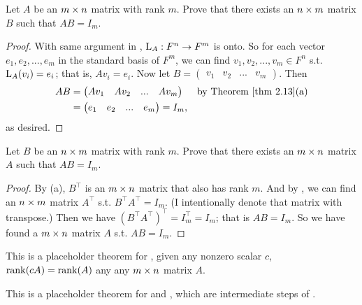 \begin{exercise} \label{exercise 3.2.21}
Let \(A\) be an \(m \times n\) matrix with rank \(m\).
Prove that there exists an \(n \times m\) matrix \(B\) such that \(AB = I_m\).
\end{exercise}

\begin{proof}
With same argument in , \(\mathrm{L}_A : F^n \to F^m\) is onto.
So for each vector \(e_1, e_2, ..., e_m\) in the standard basis of \(F^m\), we can find \(v_1, v_2, ..., v_m \in F^n\) s.t. \(\mathrm{L}_A(v_i) = e_i\);
that is, \(A v_i = e_i\).
Now let \(B = \begin{pmatrix} v_1 & v_2 & ... & v_m \end{pmatrix}\).
Then
\begin{align*}
    AB & = \begin{pmatrix} A v_1 & A v_2 & ... & A v_m \end{pmatrix} & \text{by \THM{2.13}(a)} \\
       & = \begin{pmatrix} e_1 & e_2 & ... & e_m \end{pmatrix} = I_m,
\end{align*}
as desired.
\end{proof}

\begin{exercise} \label{exercise 3.2.22}
Let \(B\) be an \(n \times m\) matrix with rank \(m\).
Prove that there exists an \(m \times n\) matrix \(A\) such that \(AB = I_m\).
\end{exercise}

\begin{proof}
By (a), \(B^\top\) is an \(m \times n\) matrix that also has rank \(m\).
And by , we can find an \(n \times m\) matrix \(A^\top\) s.t. \(B^\top A^\top = I_m\).
(I intentionally denote that matrix with transpose.)
Then we have \((B^\top A^\top)^\top = I_m^\top = I_m\);
that is \(A B = I_m\).
So we have found a \(m \times n\) matrix \(A\) s.t. \(A B = I_m\).
\end{proof}

\begin{additional theorem} \label{athm 3.4}
This is a placeholder theorem for , given any nonzero scalar \(c\), \(\mathrm{rank}(cA) = \mathrm{rank}(A)\) any any \(m \times n\) matrix \(A\).
\end{additional theorem}

\begin{additional theorem} \label{athm 3.5}
This is a placeholder theorem for  and , which are intermediate steps of .
\end{additional theorem}

